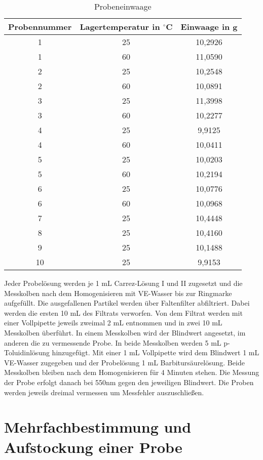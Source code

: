 \begin{table}[htbp]
	\centering
	\caption{Probeneinwaage}
		\begin{tabular}{c|c|c} 
			Probennummer & Lagertemperatur in $^\circ$C & Einwaage in g\\
			\hline
			1 & 25 & 10,2926\\
			\hline
			1 & 60 & 11,0590\\
			\hline
			2 & 25 & 10,2548\\
			\hline
			2 & 60 & 10,0891\\
			\hline
			3 & 25 & 11,3998\\
			\hline
			3 & 60 & 10,2277\\
			\hline
			4 & 25 & 9,9125\\
			\hline
			4 & 60 & 10,0411\\
			\hline
			5 & 25 & 10,0203\\
			\hline
			5 & 60 & 10,2194\\
			\hline
			6 & 25 & 10,0776\\
			\hline
			6 & 60 & 10,0968\\
			\hline
			7 & 25 & 10,4448\\
			\hline
			8 & 25 & 10,4160\\
			\hline
			9 & 25 & 10,1488\\
			\hline
			10 & 25 & 9,9153\\
		\end{tabular}
	\label{tab:Probeneinwaage}
\end{table}

Jeder Probelösung werden je 1 mL Carrez-Lösung I und II zugesetzt und die Messkolben nach dem Homogenisieren mit VE-Wasser bis zur Ringmarke aufgefüllt. Die ausgefallenen Partikel werden über Faltenfilter abfiltriert. Dabei werden die ersten 10 mL des Filtrats verworfen. Von dem Filtrat werden mit einer Vollpipette jeweils zweimal 2 mL entnommen und in zwei 10 mL Messkolben überführt. In einem Messkolben wird der Blindwert angesetzt, im anderen die zu vermessende Probe. In beide Messkolben werden 5 mL p-Toluidinlösung hinzugefügt. Mit einer 1 mL Vollpipette wird dem Blindwert 1 mL VE-Wasser zugegeben und der Probelösung 1 mL Barbitursäurelösung. Beide Messkolben bleiben nach dem Homogenisieren für 4 Minuten stehen. Die Messung der Probe erfolgt danach bei 550nm gegen den jeweiligen Blindwert. Die Proben werden jeweils dreimal vermessen um Messfehler auszuschließen.

\section{Mehrfachbestimmung und Aufstockung einer Probe}

